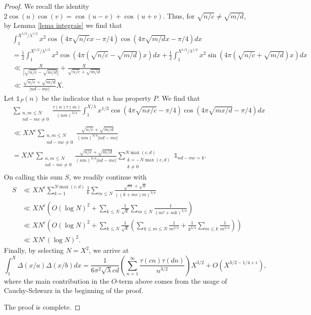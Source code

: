 \documentclass[a4paper,12pt, reqn0]{amsart}
\theoremstyle{remark}
\newcommand{\ind}{\mathds{1}}
\begin{document}
\begin{proof}
We recall the identity $2\cos(u)\cos(v)=\cos(u-v)+\cos(u+v)$.
Thus, for $\sqrt{n/c}\neq \sqrt{m/d}$, by Lemma \ref{lema integrais} we find that
\begin{align*}
&\int_{1}^{X^{1/2}/\lambda^{1/2}} x^2\cos(4\pi\sqrt{n/c}x-\pi/4)\cos(4\pi\sqrt{m/d}x-\pi/4)dx\\
&=\frac{1}{2}\int_{1}^{X^{1/2}/\lambda^{1/2}}  x^2\cos(4\pi(\sqrt{n/c}-\sqrt{m/d})x)dx+\frac{1}{2}\int_{1}^{X^{1/2}/\lambda^{1/2}} x^2\sin(4\pi(\sqrt{n/c}+\sqrt{m/d})x)dx\\
&\ll \frac{X}{\left|\sqrt{n/c}-\sqrt{m/d}\right|} + \frac{X}{\sqrt{n/c}+\sqrt{m/d}} \\
&\ll\frac{\sqrt{n/c}+\sqrt{m/d}}{|nd-mc|}X.
\end{align*}
Let $\ind_P(n)$ be the indicator that $n$ has property $P$.
We find that
\begin{align*}
&\sum_{\substack{n,m\leq N\\ nd-mc\neq0}}\frac{\tau(n)\tau(m)}{(nm)^{3/4}}\int_{1}^{X/\lambda} x^{1/2}\cos(4\pi\sqrt{nx/c}-\pi/4)\cos(4\pi\sqrt{mx/d}-\pi/4)dx\\
&\ll X N^\epsilon \sum_{\substack{n,m\leq N\\ nd-mc\neq0}}\frac{\sqrt{n/c}+\sqrt{m/d}}{(nm)^{3/4}|nd-mc|}\\
&=X N^\epsilon \sum_{\substack{n,m\leq N\\
  nd-mc\neq0}}\frac{\sqrt{n/c}+\sqrt{m/d}}{(nm)^{3/4}|nd-mc|}
  \sum_{\substack{k=-N\max(c,d)\\ k\neq 0}}^{N\max(c,d)} \ind_{nd-mc=k}.
\end{align*}
On calling this sum $S$, we readily continue with  
\begin{align*}
S&\ll X N^\epsilon \sum_{k=1}^{N\max(c,d)}\frac{1}{k}\sum_{m\leq N}\frac{\sqrt{m}+\sqrt{k}}{((k+mc)m)^{3/4}}\\
&\ll X N^\epsilon\left(O(\log N)^2+\sum_{k\leq N}\frac{1}{\sqrt{k}}\sum_{m\leq N}\frac{1}{(m^2+mk)^{3/4}} \right)\\
&\ll X N^\epsilon\left(O(\log N)^2+\sum_{k\leq N}\frac{1}{\sqrt{k}}\left(\sum_{k\leq m\leq N}\frac{1}{m^{3/2}}+\frac{1}{k^{3/4}}\sum_{m\leq k}\frac{1}{m^{3/4}}\right) \right)\\
&\ll X N^\epsilon (\log N)^2.  
\end{align*}
Finally, by selecting $N=X^2$, we arrive at
\begin{equation*}
    \int_1^X\Delta(x/a)\Delta(x/b)dx
    =
    \frac{1}{6\pi^2\sqrt{\lambda}cd}\left(
    \sum_{n=1}^\infty\frac{\tau(cn)\tau(dn)}{n^{3/2}}\right)X^{3/2}+O(X^{3/2-1/4+\epsilon}),
  \end{equation*}
  where the main contribution in the $O$-term above comes from the
  usage of Cauchy-Schwarz in the beginning of the proof.

The proof is complete.
\end{proof}
\end{document}
